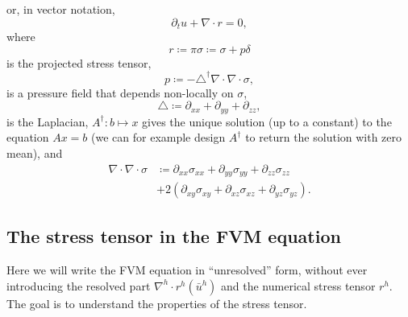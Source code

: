 \documentclass[preprint,twocolumn,5p]{elsarticle}
\begin{document}
or, in vector notation,
\begin{equation}
    \partial_t u + \nabla \cdot r = 0,
\end{equation}
where
\begin{equation}
    r \coloneq \pi \sigma \coloneq \sigma + p \delta
\end{equation}
is the projected stress tensor,
\begin{equation}
    p \coloneq -\triangle^\dagger \nabla \cdot \nabla \cdot \sigma,
\end{equation}
is a pressure field that depends non-locally on $\sigma$,
\begin{equation}
    \triangle \coloneq \partial_{x x} + \partial_{y y} + \partial_{z z},
\end{equation}
is the Laplacian,
$A^\dagger : b \mapsto x$ gives the unique solution (up to a constant) to the equation $A x =
b$ (we can for example design $A^\dagger$ to return the solution with zero
mean),
and
\begin{equation}
\begin{split}
    \nabla \cdot \nabla \cdot \sigma
    & \coloneq
    \partial_{x x} \sigma_{x x}
    + \partial_{y y} \sigma_{y y}
    + \partial_{z z} \sigma_{z z} \\
    & + 2 \left( \partial_{x y} \sigma_{x y}
    + \partial_{x z} \sigma_{x z}
+ \partial_{y z} \sigma_{y z} \right).
\end{split}
\end{equation}

\subsection{The stress tensor in the FVM equation}

Here we will write the FVM equation in ``unresolved'' form, without ever
introducing the resolved part $\nabla^h \cdot r^h(\bar{u}^h)$ and the numerical
stress tensor $r^h$.
The goal is to understand the properties of the stress tensor.
\end{document}
